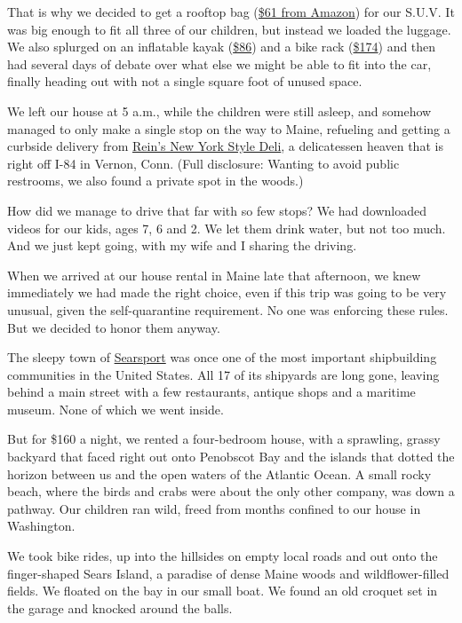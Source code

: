 That is why we decided to get a rooftop bag
(\href{https://www.amazon.com/gp/product/B072ZHRDMZ/ref=ppx_yo_dt_b_asin_title_o09_s00?ie=UTF8\&psc=1}{\$61
from Amazon}) for our S.U.V. It was big enough to fit all three of our
children, but instead we loaded the luggage. We also splurged on an
inflatable kayak
(\href{https://www.walmart.com/ip/Intex-Explorer-K2-Inflatable-Kayak-with-Oars-and-Hand-Pump/23662871}{\$86})
and a bike rack
(\href{https://www.amazon.com/gp/product/B00AW6XL8K/ref=ppx_yo_dt_b_asin_title_o00_s00?ie=UTF8\&psc=1}{\$174})
and then had several days of debate over what else we might be able to
fit into the car, finally heading out with not a single square foot of
unused space.

We left our house at 5 a.m., while the children were still asleep, and
somehow managed to only make a single stop on the way to Maine,
refueling and getting a curbside delivery from
\href{https://www.reinsdeli.com/Default.aspx}{Rein's New York Style
Deli}, a delicatessen heaven that is right off I-84 in Vernon, Conn.
(Full disclosure: Wanting to avoid public restrooms, we also found a
private spot in the woods.)

How did we manage to drive that far with so few stops? We had downloaded
videos for our kids, ages 7, 6 and 2. We let them drink water, but not
too much. And we just kept going, with my wife and I sharing the
driving.

When we arrived at our house rental in Maine late that afternoon, we
knew immediately we had made the right choice, even if this trip was
going to be very unusual, given the self-quarantine requirement. No one
was enforcing these rules. But we decided to honor them anyway.

The sleepy town of \href{https://searsport.maine.gov/}{Searsport} was
once one of the most important shipbuilding communities in the United
States. All 17 of its shipyards are long gone, leaving behind a main
street with a few restaurants, antique shops and a maritime museum. None
of which we went inside.

But for \$160 a night, we rented a four-bedroom house, with a sprawling,
grassy backyard that faced right out onto Penobscot Bay and the islands
that dotted the horizon between us and the open waters of the Atlantic
Ocean. A small rocky beach, where the birds and crabs were about the
only other company, was down a pathway. Our children ran wild, freed
from months confined to our house in Washington.

We took bike rides, up into the hillsides on empty local roads and out
onto the finger-shaped Sears Island, a paradise of dense Maine woods and
wildflower-filled fields. We floated on the bay in our small boat. We
found an old croquet set in the garage and knocked around the balls.

